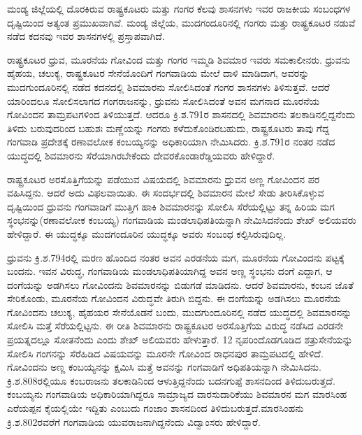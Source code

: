 ಮಂಡ್ಯ ಜಿಲ್ಲೆಯಲ್ಲಿ ದೊರಕಿರುವ ರಾಷ್ಟ್ರಕೂಟರು ಮತ್ತು ಗಂಗರ ಕೆಲವು ಶಾಸನಗಳು ಇವರ ರಾಜಕೀಯ ಸಂಬಂಧಗಳ ದೃಷ್ಟಿಯಿಂದ ಅತ್ಯಂತ ಪ್ರಮುಖವಾಗಿವೆ. ಮಂಡ್ಯ ಜಿಲ್ಲೆಯ, ಮುದಗಂದೂರಿನಲ್ಲಿ ಗಂಗರು ಮತ್ತು ರಾಷ್ಟ್ರಕೂಟರ ನಡುವೆ ನಡೆದ ಕದನವು ಇವರ ಶಾಸನಗಳಲ್ಲಿ ಪ್ರಸ್ತಾಪವಾಗಿದೆ.

ರಾಷ್ಟ್ರಕೂಟರ ಧ್ರುವ, ಮೂರನೆಯ ಗೋವಿಂದ ಮತ್ತು ಗಂಗರ ಇಮ್ಮಡಿ ಶಿವಮಾರ ಇವರು ಸಮಕಾಲೀನರು. ಧ್ರುವನು ಹೈಹಯ, ಚಲುಕ್ಯ, ರಾಷ್ಟ್ರಕೂಟರ ಸೇನೆಯೊಂದಿಗೆ ಗಂಗವಾಡಿಯ ಮೇಲೆ ದಾಳಿ ಮಾಡಿದಾಗ, ಅವರನ್ನು ಮುದಗುಂದೂರಿನಲ್ಲಿ ನಡೆದ ಕದನದಲ್ಲಿ ಶಿವಮಾರನು ಸೋಲಿಸಿದಂತೆ ಗಂಗರ ಶಾಸನಗಳು ತಿಳಿಸುತ್ತವೆ. ಆದರೆ ಯಾರಿಂದಲೂ ಸೋಲಿಸಲಾಗದ ಗಂಗರಾಜನನ್ನು, ಧ್ರುವನು ಸೋಲಿಸಿದಂತೆ ಅವನ ಮಗನಾದ ಮೂರನೆಯ ಗೋವಿಂದನ ತಾಮ್ರಪಟಗಳಿಂದ ತಿಳಿಯುತ್ತದೆ. ಆದರೂ ಕ್ರಿ.ಶ.791ರ ಶಾಸನದಲ್ಲಿ ಶಿವಮಾರನು ತಲಕಾಡಿನಲ್ಲಿದ್ದನೆಂದು ತಿಳಿದು ಬರುವುದ\-ರಿಂದ ಬಹುಶಃ ಮಣ್ಣೆಯನ್ನು ಗಂಗರು ಕಳೆದುಕೊಂಡಿರಬಹುದು, ರಾಷ್ಟ್ರಕೂಟರು ತಾವು ಗೆದ್ದ ಗಂಗವಾಡಿ ಪ್ರದೇಶಕ್ಕೆ ರಣಾವಲೋಕ ಕಂಬಯ್ಯನನ್ನು ಅಧಿಕಾರಿಯಾಗಿ ನೇಮಿಸಿದರು. ಕ್ರಿ.ಶ.791ರ ನಂತರ ನಡೆದ ಯುದ್ಧದಲ್ಲಿ ಶಿವಮಾರನು ಸೆರೆಯಾಗಿರಬೇಕೆಂದು ದೇವರಕೊಂಡಾರೆಡ್ಡಿಯವರು ಹೇಳಿದ್ದಾರೆ.

ರಾಷ್ಟ್ರಕೂಟರ ಅರಸೊತ್ತಿಗೆಯನ್ನು ಪಡೆಯುವ ವಿಷಯದಲ್ಲಿ ಶಿವಮಾರನು ಧ್ರುವನ ಅಣ್ಣ ಗೋವಿಂದನ ಪರ ವಹಿಸಿದ್ದನು. ಆದರೆ ಅದು ವಿಫಲವಾಯಿತು. ಈ ಸಂದರ್ಭದಲ್ಲಿ ಶಿವಮಾರನ ಮೇಲೆ ಸೇಡು ತೀರಿಸಿಕೊಳ್ಳುವ ದೃಷ್ಟಿಯಿಂದ ಧ್ರುವನು ಗಂಗವಾಡಿಗೆ ಮುತ್ತಿಗ ಹಾಕಿ ಶಿವಮಾರನನ್ನು ಸೋಲಿಸಿ ಸೆರೆಯಲ್ಲಿಟ್ಟು ತನ್ನ ಹಿರಿಯ ಮಗ ಸ್ಥಂಭನನ್ನು\break (ರಣಾವಲೋಕ ಕಂಬಯ್ಯ) ಗಂಗವಾಡಿಯ ಮಂಡಲಾಧಿಪತಿಯನ್ನಾಗಿ ನೇಮಿಸಿದನೆಂದು ಶೇಖ್​ ಅಲಿಯವರು ಹೇಳಿದ್ದಾರೆ. ಈ ಯುದ್ಧಕ್ಕೂ ಮುದಗಂದೂರಿನ ಯುದ್ಧಕ್ಕೂ ಅವರು ಸಂಬಂಧ ಕಲ್ಪಿಸಿರುವುದಿಲ್ಲ.

ಧ್ರುವನು ಕ್ರಿ.ಶ.794ರಲ್ಲಿ ಮರಣ ಹೊಂದಿದ ನಂತರ ಅವನ ಎರಡನೆಯ ಮಗ, ಮೂರನೆಯ ಗೋವಿಂದನು ಪಟ್ಟಕ್ಕೆ ಬಂದನು. ಇವನ ವಿರುದ್ಧ, ಗಂಗವಾಡಿಯ ಮಂಡಲಾಧಿಪತಿಯಾಗಿದ್ದ ಅವನ ಅಣ್ಣ ಸ್ಥಂಭನು ದಂಗೆ ಎದ್ದಾಗ, ಆ ದಂಗೆಯನ್ನು ಅಡಗಿಸಲು ಗೋವಿಂದನು ಶಿವಮಾರನನ್ನು ಬಿಡುಗಡೆ ಮಾಡಿದನು. ಆದರೆ ಶಿವಮಾರನು, ಕಂಬನ ಜೊತೆ ಸೇರಿಕೊಂಡು, ಮೂರನೆಯ ಗೋವಿಂದನ ವಿರುದ್ಧವೇ ತಿರುಗಿ ಬಿದ್ದನು. ಈ ದಂಗೆಯನ್ನು ಅಡಗಿಸಲು ಮೂರನೆಯ ಗೋವಿಂದನು ಚಲುಕ್ಯ, ಹೈಹಯರ ಸೇನೆಯೊಡನೆ ಬಂದು, ಮುದಗುಂದೂರಿನಲ್ಲಿ ನಡೆದ ಯುದ್ಧದಲ್ಲಿ ಶಿವಮಾರನನ್ನು ಸೋಲಿಸಿ ಮತ್ತೆ ಸೆರೆಯಲ್ಲಿಟ್ಟನು. ಈ ರೀತಿ ಶಿವಮಾರನು ರಾಷ್ಟ್ರಕೂಟರ ಅರಸೊತ್ತಿಗೆಯ ವಿರುದ್ಧ ನಡೆಸಿದ ಎರಡನೇ ಪ್ರಯತ್ನದಲ್ಲೂ ಸೋತನೆಂದು ಎಂದು ಶೇಖ್​ ಅಲಿಯವರು ಹೇಳುತ್ತಾರೆ. 12 ನೃಪರಿಂದೊಡಗೂಡಿದ ಶತ್ರುಸೇನೆಯನ್ನು ಸೋಲಿಸಿ ಗಂಗನನ್ನು ಸೆರೆಹಿಡಿದ ವಿಷಯವನ್ನು ಮೂರನೇ ಗೋವಿಂದ ರಾಧನಪುರ ತಾಮ್ರಪಟದಲ್ಲಿ ಹೇಳಿದೆ. ಗೋವಿಂದನು ಅಣ್ಣ ಕಂಬಯ್ಯನನ್ನು ಕ್ಷಮಿಸಿ ಮತ್ತೆ ಅವನನ್ನು ಗಂಗವಾಡಿಗೆ ಅಧಿಪತಿಯನ್ನಾಗಿ ನೇಮಿಸಿದನು. ಕ್ರಿ.ಶ.808ರಲ್ಲಿಯೂ ಕಂಬರಾಜನು ತಲಕಾಡಿನಿಂದ ಆಳುತ್ತಿದ್ದನೆಂದು ಬದನಗುಪ್ಪೆ ಶಾಸನದಿಂದ ತಿಳಿದುಬರುತ್ತದೆ. ಕಂಬಯ್ಯನು ಗಂಗವಾಡಿಯ ಅಧಿಕಾರಿಯಾಗಿದ್ದರೂ ಸಾಮ್ರಾಜ್ಯದ ವಾರಸುದಾರಿಕೆಯು ಶಿವಮಾರನ ಮಗ ಮಾರಸಿಂಹ ಎರೆಯಪ್ಪನ ಕೈಯಲ್ಲಿಯೇ ಇದ್ದಿತು ಎಂಬುದು ಗಂಜಾಂ ಶಾಸನದಿಂದ ತಿಳಿದುಬರುತ್ತದೆ.ಮಾರಸಿಂಹನು ಕ್ರಿ.ಶ.802ರವರೆಗೆ ಗಂಗವಾಡಿಯ ಯುವರಾಜನಾಗಿದ್ದನೆಂದು ವಿದ್ವಾಂಸರು ಹೇಳಿದ್ದಾರೆ.

